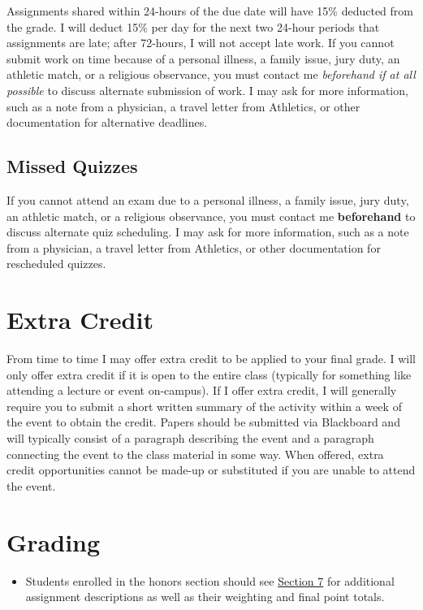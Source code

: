 \documentclass[
]{book}
\newenvironment{rmdblock}[1]
  {\begin{shaded*}
  \begin{itemize}
  \renewcommand{\labelitemi}{
    \raisebox{-.7\height}[0pt][0pt]{
      {\setkeys{Gin}{width=3em,keepaspectratio}\texttt{[image: images/\#1]}}
    }
  }
  \item
  }
  {
  \end{itemize}
  \end{shaded*}
  }
\newenvironment{rmdwarning}
  {\begin{rmdblock}{warning}}
  {\end{rmdblock}}
\begin{document}
Assignments shared within 24-hours of the due date will have 15\% deducted from the grade. I will deduct 15\% per day for the next two 24-hour periods that assignments are late; after 72-hours, I will not accept late work. If you cannot submit work on time because of a personal illness, a family issue, jury duty, an athletic match, or a religious observance, you must contact me \emph{beforehand if at all possible} to discuss alternate submission of work. I may ask for more information, such as a note from a physician, a travel letter from Athletics, or other documentation for alternative deadlines.

\hypertarget{missed-quizzes}{%
\subsection{Missed Quizzes}\label{missed-quizzes}}

If you cannot attend an exam due to a personal illness, a family issue, jury duty, an athletic match, or a religious observance, you must contact me \textbf{beforehand} to discuss alternate quiz scheduling. I may ask for more information, such as a note from a physician, a travel letter from Athletics, or other documentation for rescheduled quizzes.

\hypertarget{extra-credit}{%
\section{Extra Credit}\label{extra-credit}}

From time to time I may offer extra credit to be applied to your final grade. I will only offer extra credit if it is open to the entire class (typically for something like attending a lecture or event on-campus). If I offer extra credit, I will generally require you to submit a short written summary of the activity within a week of the event to obtain the credit. Papers should be submitted via Blackboard and will typically consist of a paragraph describing the event and a paragraph connecting the event to the class material in some way. When offered, extra credit opportunities cannot be made-up or substituted if you are unable to attend the event.

\hypertarget{grading}{%
\section{Grading}\label{grading}}

\begin{rmdwarning}
Students enrolled in the honors section should see
\href{/syllabus/honors-overview.html}{Section 7} for additional
assignment descriptions as well as their weighting and final point
totals.
\end{rmdwarning}
\end{document}
